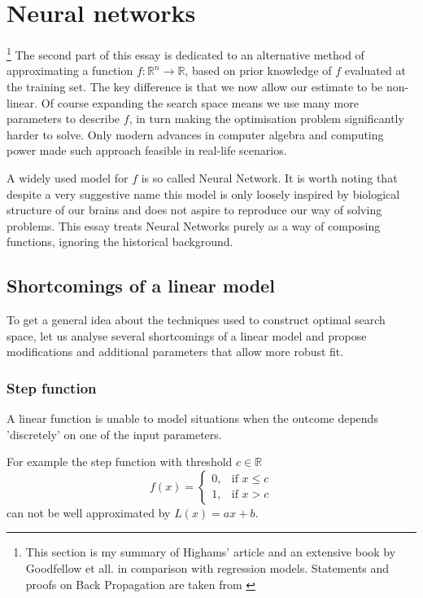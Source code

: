 \documentclass[a4paper,11pt]{article}
\theoremstyle{break}
\newcommand{\R}{\mathbb{R}}
\begin{document}

\section{Neural networks}

\footnote{This section is my summary of Highams' article \cite{higham} and an extensive book by Goodfellow et all. \cite{goodfellow} in comparison with regression models. Statements and proofs on Back Propagation are taken from \cite{higham}}
%
The second part of this essay is dedicated to an alternative method of approximating a function $ f : \R^n \to \R$, based on prior knowledge of $f$ evaluated at the training set. The key difference is that we now allow our estimate to be non-linear. Of course expanding the search space means we use many more parameters to describe $f$, in turn making the optimisation problem significantly harder to solve. Only modern advances in computer algebra and computing power made such approach feasible in real-life scenarios.

A widely used model for $f$ is so called Neural Network. It is worth noting that despite a very suggestive name this model is only loosely inspired by biological structure of our brains and does not aspire to reproduce our way of solving problems. This essay treats Neural Networks purely as a way of composing functions, ignoring the historical background.

\subsection{Shortcomings of a linear model}
To get a general idea about the techniques used to construct optimal search space, let us analyse several shortcomings of a linear model and propose modifications and additional parameters that allow more robust fit.

\subsubsection{Step function}
A linear function is unable to model situations when the outcome depends 'discretely' on one of the input parameters.

For example the step function with threshold $c \in \R$
$$ f(x) =
\begin{cases}
    0,& \text{if } x\leq c\\
    1,& \text{if } x > c
\end{cases}$$
can not be well approximated by $L(x) = a x  + b$.
\end{document}
